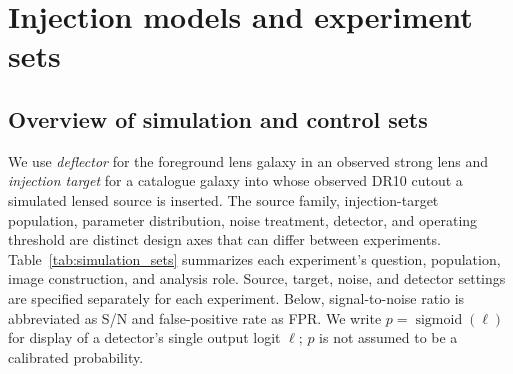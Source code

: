 \section{Injection models and experiment sets}
\label{sec:injection_models}

\subsection{Overview of simulation and control sets}
\label{sec:simulation_inventory}

We use \emph{deflector} for the foreground lens galaxy in an observed strong
lens and \emph{injection target} for a catalogue galaxy into whose observed
DR10 cutout a simulated lensed source is inserted.
The source family, injection-target population, parameter distribution, noise
treatment, detector, and operating threshold are distinct design axes that can
differ between experiments.
Table~\ref{tab:simulation_sets} summarizes each experiment's question,
population, image construction, and analysis role. Source, target, noise, and
detector settings are specified separately for each experiment. Below,
signal-to-noise ratio is abbreviated as S/N and false-positive rate as FPR. We write
\(p=\operatorname{sigmoid}(\ell)\) for display of a detector's single output
logit \(\ell\); \(p\) is not assumed to be a calibrated probability.

